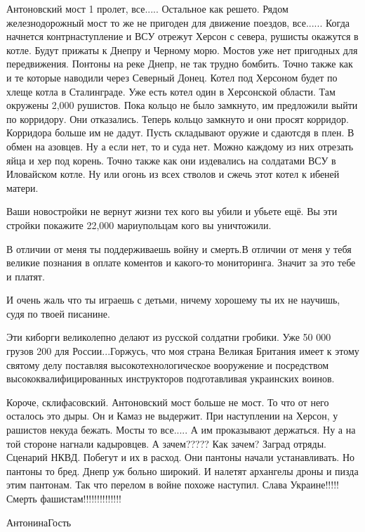 Антоновский мост 1 пролет, все.....
Остальное как решето. Рядом железнодорожный мост то же 
не пригоден для движение поездов, все......
Когда начнется контрнаступление и ВСУ отрежут Херсон
с севера, рушисты окажутся в котле. Будут прижаты к Днепру 
и Черному морю. Мостов уже нет пригодных для передвижения.
Понтоны на реке Днепр, не так трудно бомбить. Точно также как
и те которые наводили через Северный Донец. 
Котел под Херсоном будет по хлеще котла в Сталинграде.
Уже есть котел один в Херсонской области. Там окружены 
2,000 рушистов. Пока кольцо не было замкнуто, им предложили
выйти по корридору. Они отказались. Теперь кольцо замкнуто и 
они просят корридор. Корридора больше им не дадут.
Пусть складывают оружие и сдаютсдя в плен. В обмен на 
азовцев. Ну а если нет, то и суда нет. Можно каждому
из них отрезать яйца и хер под корень. Точно также как
они издевались на солдатами ВСУ в Иловайском котле.
Ну или огонь из всех стволов и сжечь этот котел к
ибеней матери.

Ваши новостройки не вернут жизни тех кого вы убили и убьете ещё. Вы эти стройки
покажите 22,000 мариупольцам кого вы уничтожили.

В отличии от меня ты поддерживаешь войну и смерть.В отличии от меня у тебя
великие познания в оплате коментов и какого-то мониторинга. Значит за это тебе и
платят.

И очень жаль что ты играешь с детьми, ничему хорошему ты их не научишь, судя по
твоей писанине.

Эти киборги великолепно делают из русской солдатни гробики. Уже 50 000 грузов
200 для России...Горжусь, что моя страна Великая Британия имеет к этому святому
делу поставляя высокотехнологическое вооружение и посредством
высококвалифицированных инструкторов подготавливая украинских воинов.

Короче, склифасовский.
Антоновский мост больше не мост. То что от него осталось
это дыры. Он и Камаз не выдержит. При наступлении на Херсон,
у рашистов некуда бежать. Мосты то все..... А им проказывают держаться.
Ну а на той стороне нагнали кадыровцев. А зачем????? Как зачем?
Заград отряды. Сценарий НКВД. Побегут и их в расход.
Они пантоны начали устанавливать. Но пантоны то бред.
Днепр уж больно широкий. И налетят архангелы дроны и пизда
этим пантонам. Так что перелом в войне похоже наступил.
Слава Украине!!!!! Смерть фашистам!!!!!!!!!!!!!!


АнтонинаГость

